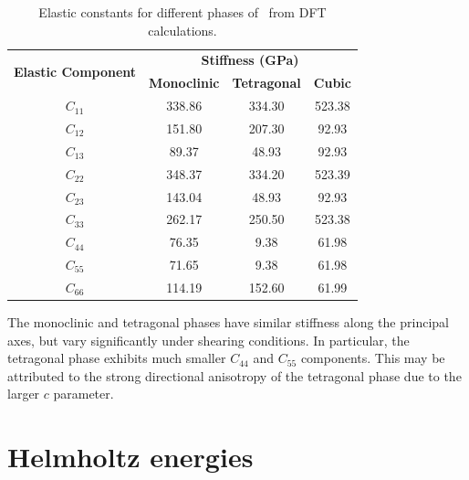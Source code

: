\begin{table}[ht] %
\onehalfspacing
\centering
\caption{Elastic constants for different phases of \zirconia\ from DFT calculations.}
\label{stiffness_tensor}
\begin{tabular}{cccc}
\hline
\multirow{2}{*}{\textbf{Elastic Component}} & \multicolumn{3}{c}{\textbf{Stiffness (GPa)}}               \\ \cline{2-4} 
                                            & \textbf{Monoclinic} & \textbf{Tetragonal} & \textbf{Cubic} \\ \hline
$C_{11}$                                         & 338.86        & 334.30               & 523.38    \\
$C_{12}$                                         & 151.80        & 207.30               & 92.93     \\
$C_{13}$                                         & 89.37         & 48.93               & 92.93     \\
$C_{22}$                                         & 348.37        & 334.20               & 523.39    \\
$C_{23}$                                         & 143.04        & 48.93               & 92.93    \\
$C_{33}$                                         & 262.17        & 250.50               & 523.38   \\
$C_{44}$                                         & 76.35         & 9.38                & 61.98    \\
$C_{55}$                                         & 71.65         & 9.38                & 61.98   \\
$C_{66}$                                         & 114.19        & 152.60               & 61.99     \\ \hline
\end{tabular}
\end{table}


The monoclinic and tetragonal phases have similar stiffness along the principal axes, but vary significantly under shearing conditions. In particular, the tetragonal phase exhibits much smaller $C_{44}$ and $C_{55}$ components. This may be attributed to the strong directional anisotropy of the tetragonal phase due to the larger $c$ parameter. 





\section{Helmholtz energies}


